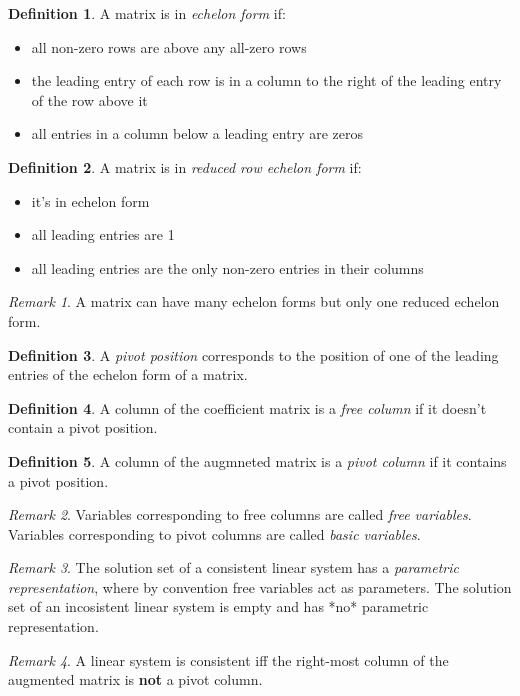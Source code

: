 \documentclass{article}
\theoremstyle{definition}
\newtheorem{definition}{Definition}[section]
\theoremstyle{remark}
\newtheorem*{remark}{Remark}
\theoremstyle{remark}
\theoremstyle{remark}
\newtheorem*{it follows}{It follows}
\begin{document}
  \begin{definition}
    A matrix is in \textit{echelon form} if:
    \begin{itemize}
      \item all non-zero rows are above any all-zero rows
      \item the leading entry of each row is in a column to the right of the leading entry of the row above it
      \item all entries in a column below a leading entry are zeros
    \end{itemize}
  \end{definition}

  \begin{definition}
    A matrix is in \textit{reduced row echelon form} if:
    \begin{itemize}
      \item it's in echelon form
      \item all leading entries are 1
      \item all leading entries are the only non-zero entries in their columns
    \end{itemize}
  \end{definition}

  \begin{remark}
    A matrix can have many echelon forms but only one reduced echelon form.
  \end{remark}

  \begin{definition}
    A \textit{pivot position} corresponds to the position of one of the leading entries of the echelon form of a matrix.
  \end{definition}

  \begin{definition}
    A column of the coefficient matrix is a \textit{free column} if it doesn't contain a pivot position.
  \end{definition}

  \begin{definition}
    A column of the augmneted matrix is a \textit{pivot column} if it contains a pivot position.
  \end{definition}

  \begin{remark}
    Variables corresponding to free columns are called \textit{free variables}. Variables corresponding to pivot columns are called \textit{basic variables}.
  \end{remark}

  \begin{remark}
    The solution set of a consistent linear system has a \textit{parametric representation}, where by convention free variables act as parameters. The solution set of an incosistent linear system is empty and has *no* parametric representation.
  \end{remark}

  \begin{remark}
    A linear system is consistent iff the right-most column of the augmented matrix is \textbf{not} a pivot column.
  \end{remark}
\end{document}
